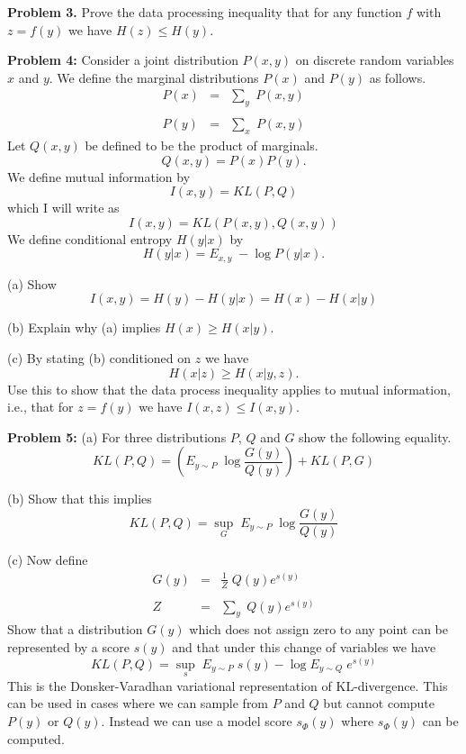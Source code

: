 \documentclass{article}
\begin{document}
\bigskip
{\bf Problem 3.}
Prove the data processing inequality that for any function $f$ with $z = f(y)$ we have $H(z) \leq H(y)$.

\bigskip
{\bf Problem 4:} Consider a joint distribution $P(x,y)$ on discrete random variables $x$ and $y$.
We define the marginal distributions $P(x)$ and $P(y)$ as follows.
\begin{eqnarray*}
  P(x) & = & \sum_y\;P(x,y) \\
  \\
  P(y) & = & \sum_x\;P(x,y)
\end{eqnarray*}
Let $Q(x,y)$ be defined to be the product of marginals.
$$Q(x,y) = P(x)P(y).$$
We define mutual information by
{\color{red} $$I(x,y) = KL(P,Q)$$}
which I will write as
{\color{red} $$I(x,y) = KL(P(x,y),Q(x,y))$$}
We define conditional entropy $H(y|x)$ by
{\color{red} $$H(y|x) = E_{x,y} \;-\log P(y|x).$$}

(a) Show
{\color{red} $$I(x,y) = H(y) - H(y|x) = H(x) - H(x|y)$$}

(b) Explain why (a) implies $H(x) \geq H(x|y)$.

\medskip
(c) By stating (b) conditioned on $z$ we have
$$H(x|z) \geq H(x|y,z).$$
Use this to show that the data process inequality applies to mutual information,
i.e., that for $z = f(y)$ we have $I(x,z) \leq I(x,y)$.

\bigskip
{\bf Problem 5:}
(a) For three distributions $P$, $Q$ and $G$ show the following equality.
$$KL(P,Q) =  \left(E_{y \sim P} \;\log \frac{G(y)}{Q(y)}\right) + KL(P,G)$$

(b) Show that this implies
$$KL(P,Q) =  \sup_G \;E_{y \sim P}\; \log \frac{G(y)}{Q(y)}$$

(c) Now define
\begin{eqnarray*}
  G(y) & = & \frac{1}{Z}\;Q(y)e^{s(y)} \\
  \\
  Z & = & \sum_y \;Q(y)e^{s(y)}
\end{eqnarray*}
Show that a distribution $G(y)$ which does not assign zero to any point can be represented by a score $s(y)$ and that under this
change of variables we have
$$KL(P,Q) =  \sup_s \;E_{y \sim P}\; s(y) - \log E_{y \sim Q} \;e^{s(y)}$$
This is the Donsker-Varadhan variational representation of KL-divergence.
This can be used in cases where we can sample from $P$ and $Q$ but cannot compute $P(y)$ or $Q(y)$.
Instead we can use a model score $s_\Phi(y)$ where $s_\Phi(y)$ can be computed.
\end{document}
